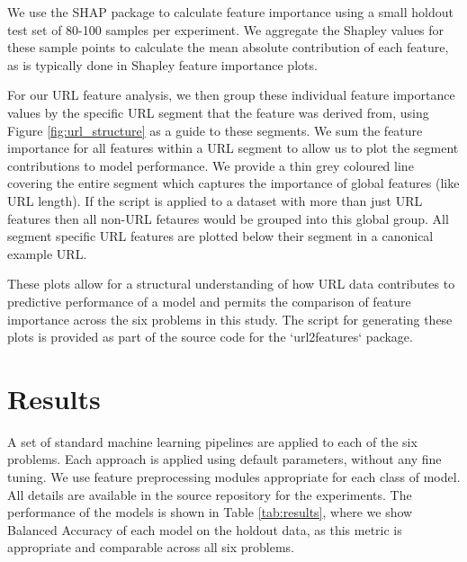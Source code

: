 \documentclass{aircc}
\begin{document}
We use the SHAP\cite{Lundberg2017} package to calculate feature importance using a small holdout test set 
of 80-100 samples per experiment. We aggregate the Shapley values for these sample points to calculate the mean
absolute contribution of each feature, as is typically done in Shapley feature importance plots.

For our URL feature analysis, we then group these individual feature importance values by the specific URL segment
that the feature was derived from, using Figure \ref{fig:url_structure} as a guide to these segments. 
We sum the feature importance for all features within a URL segment to allow us to plot the
segment contributions to model performance. We provide a thin grey coloured line covering the entire segment
which captures the importance of global features (like URL length). If the script is applied to a dataset with
more than just URL features then all non-URL fetaures would be grouped into this global group. All segment specific
URL features are plotted below their segment in a canonical example URL.

These plots allow for a structural understanding of how URL data
contributes to predictive performance of a model and permits the comparison of feature importance 
across the six problems in this study. The script for generating these plots is provided as part 
of the source code for the `url2features` package.

\section{Results}

A set of standard machine learning pipelines are applied to each of the six problems. Each approach is applied
using default parameters, without any fine tuning. We use feature preprocessing modules appropriate for each class
of model. All details are available in the source repository for the experiments. The performance of the models
is shown in Table \ref{tab:results}, where we show Balanced Accuracy of each model on the holdout data, as this
metric is appropriate and comparable across all six problems. 

\begin{table}
\caption{Machine Learning Results}
\fontsize{3pt}{3pt}\selectfont
\label{tab:results}
\end{table}
\end{document}
